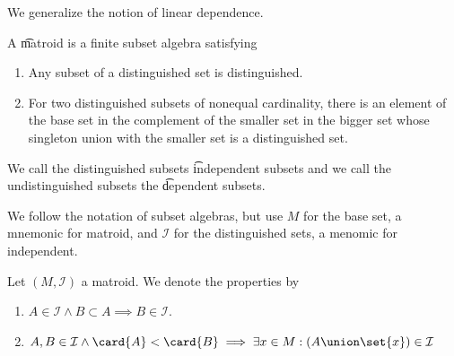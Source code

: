 

We generalize the notion of linear dependence.


A \t{matroid} is a finite subset algebra satisfying
  \begin{enumerate}
  \item Any subset of a distinguished set is distinguished.
  \item For two distinguished subsets of nonequal cardinality, there is an element of the base set in the complement of the smaller set in the bigger set whose singleton union with the smaller set is a distinguished set.
  \end{enumerate}
We call the distinguished subsets \t{independent subsets} and we call the undistinguished subsets the \t{dependent subsets}.


We follow the notation of subset algebras, but use $M$ for the base
set, a mnemonic for matroid, and $\mathcal{I}$ for the distinguished
sets, a menomic for independent.

Let $(M, \mathcal{I})$ a matroid.
We denote the properties by
\begin{enumerate}
  \item $A \in \mathcal{I} \land B \subset A \implies B \in \mathcal{I}$.
  \item $A, B \in \mathcal{I} \land \card{A} < \card{B} \implies \exists x \in M: (A \union \set{x}) \in \mathcal{I}$
\end{enumerate}

\blankpage

